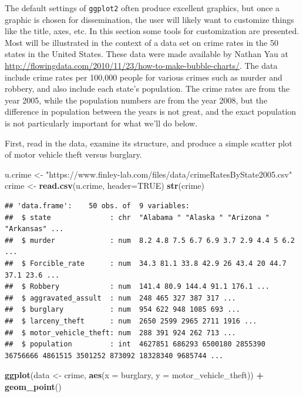 \documentclass[
]{krantz}
\newenvironment{Shaded}{\begin{snugshade}}{\end{snugshade}}
\newcommand{\DataTypeTok}[1]{\textcolor[rgb]{0.13,0.29,0.53}{#1}}
\newcommand{\KeywordTok}[1]{\textcolor[rgb]{0.13,0.29,0.53}{\textbf{#1}}}
\newcommand{\NormalTok}[1]{#1}
\newcommand{\OperatorTok}[1]{\textcolor[rgb]{0.81,0.36,0.00}{\textbf{#1}}}
\newcommand{\OtherTok}[1]{\textcolor[rgb]{0.56,0.35,0.01}{#1}}
\newcommand{\StringTok}[1]{\textcolor[rgb]{0.31,0.60,0.02}{#1}}
\begin{document}
The default settings of \texttt{ggplot2} often produce excellent graphics, but once a graphic is chosen for dissemination, the user will likely want to customize things like the title, axes, etc. In this section some tools for customization are presented. Most will be illustrated in the context of a data set on crime rates in the 50 states in the United States. These data were made available by Nathan Yau at \url{http://flowingdata.com/2010/11/23/how-to-make-bubble-charts/}. The data include crime rates per 100,000 people for various crimes such as murder and robbery, and also include each state's population. The crime rates are from the year 2005, while the population numbers are from the year 2008, but the difference in population between the years is not great, and the exact population is not particularly important for what we'll do below.

First, read in the data, examine its structure, and produce a simple scatter plot of motor vehicle theft versus burglary.

\begin{Shaded}
\begin{Highlighting}[]
\NormalTok{u.crime \textless{}{-}}\StringTok{ "https://www.finley{-}lab.com/files/data/crimeRatesByState2005.csv"}
\NormalTok{crime \textless{}{-}}\StringTok{ }\KeywordTok{read.csv}\NormalTok{(u.crime, }\DataTypeTok{header=}\OtherTok{TRUE}\NormalTok{)}
\KeywordTok{str}\NormalTok{(crime)}
\end{Highlighting}
\end{Shaded}

\begin{verbatim}
## 'data.frame':    50 obs. of  9 variables:
##  $ state              : chr  "Alabama " "Alaska " "Arizona " "Arkansas" ...
##  $ murder             : num  8.2 4.8 7.5 6.7 6.9 3.7 2.9 4.4 5 6.2 ...
##  $ Forcible_rate      : num  34.3 81.1 33.8 42.9 26 43.4 20 44.7 37.1 23.6 ...
##  $ Robbery            : num  141.4 80.9 144.4 91.1 176.1 ...
##  $ aggravated_assult  : num  248 465 327 387 317 ...
##  $ burglary           : num  954 622 948 1085 693 ...
##  $ larceny_theft      : num  2650 2599 2965 2711 1916 ...
##  $ motor_vehicle_theft: num  288 391 924 262 713 ...
##  $ population         : int  4627851 686293 6500180 2855390 36756666 4861515 3501252 873092 18328340 9685744 ...
\end{verbatim}

\begin{Shaded}
\begin{Highlighting}[]
\KeywordTok{ggplot}\NormalTok{(data \textless{}{-}}\StringTok{ }\NormalTok{crime, }\KeywordTok{aes}\NormalTok{(}\DataTypeTok{x =}\NormalTok{ burglary, }\DataTypeTok{y =}\NormalTok{ motor\_vehicle\_theft)) }\OperatorTok{+}\StringTok{ }
\StringTok{  }\KeywordTok{geom\_point}\NormalTok{()}
\end{Highlighting}
\end{Shaded}
\end{document}
